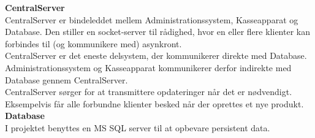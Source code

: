 \textbf{CentralServer}\\
CentralServer er bindeleddet mellem Administrationssystem, Kasseapparat og Database. Den stiller en socket-server til rådighed, hvor en eller flere klienter kan forbindes til (og kommunikere med) asynkront.\\

CentralServer er det eneste delsystem, der kommunikerer direkte med Database. Administrationssystem og Kasseapparat kommunikerer derfor indirekte med Database gennem CentralServer.\\

CentralServer sørger for at transmittere opdateringer når det er nødvendigt. Eksempelvis får alle forbundne klienter besked når der oprettes et nye produkt.\\

\textbf{Database}\\
I projektet benyttes en MS SQL server til at opbevare persistent data.
